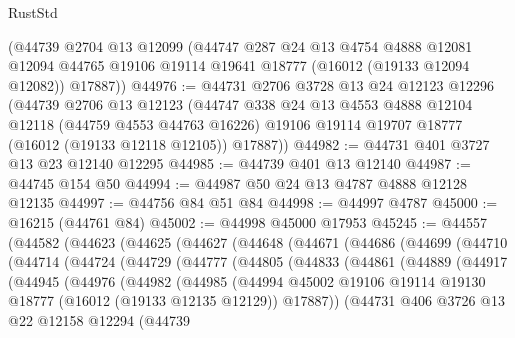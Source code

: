 \begin{lexlean}{RustStd}
\begin{coremodule}
    (@44739
      @2704
      @13
      @12099
      (@44747
        @287
        @24
        @13
        @4754
        @4888
        @12081
        @12094
        @44765
        @19106
        @19114
        @19641
        @18777
        (@16012 (@19133 @12094 @12082))
        @17887))
@44976 := @44731
    @2706
    @3728
    @13
    @24
    @12123
    @12296
    (@44739
      @2706
      @13
      @12123
      (@44747
        @338
        @24
        @13
        @4553
        @4888
        @12104
        @12118
        (@44759 @4553 @44763 @16226)
        @19106
        @19114
        @19707
        @18777
        (@16012 (@19133 @12118 @12105))
        @17887))
@44982 := @44731 @401 @3727 @13 @23 @12140 @12295
@44985 := @44739 @401 @13 @12140
@44987 := @44745 @154 @50
@44994 := @44987 @50 @24 @13 @4787 @4888 @12128 @12135
@44997 := @44756 @84 @51 @84
@44998 := @44997 @4787
@45000 := @16215 (@44761 @84)
@45002 := @44998 @45000 @17953
@45245 := @44557
    (@44582
      (@44623
        (@44625
          (@44627
            (@44648
              (@44671
                (@44686
                  (@44699
                    (@44710
                      (@44714
                        (@44724
                          (@44729
                            (@44777
                              (@44805
                                (@44833
                                  (@44861
                                    (@44889
                                      (@44917
                                        (@44945
                                          (@44976
                                            (@44982
                                              (@44985
                                                (@44994
                                                  @45002
                                                  @19106
                                                  @19114
                                                  @19130
                                                  @18777
                                                  (@16012 (@19133 @12135 @12129))
                                                  @17887))
                                              (@44731
                                                @406
                                                @3726
                                                @13
                                                @22
                                                @12158
                                                @12294
                                                (@44739

\end{coremodule}
\end{lexlean}
